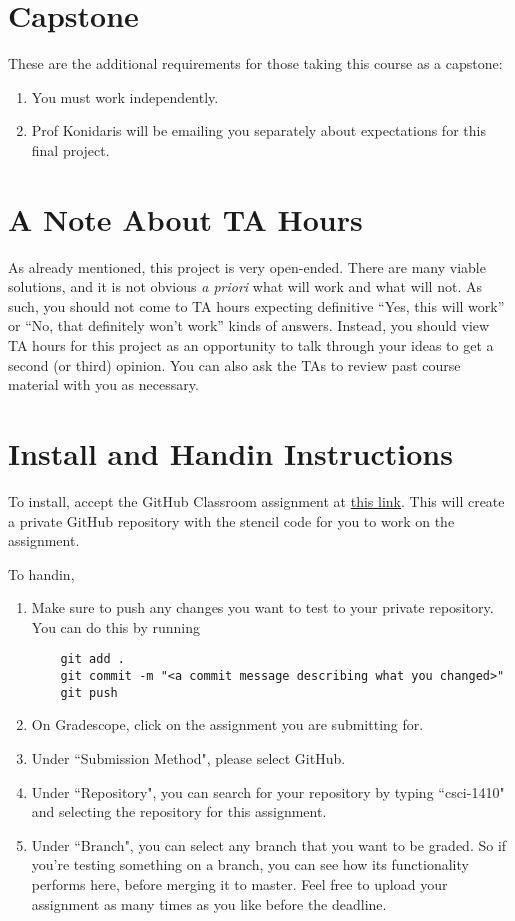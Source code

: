 \documentclass{article}
\begin{document}
\section{Capstone}
These are the additional requirements for those taking this course as a capstone:

\begin{enumerate}
\item You must work independently.

\item Prof Konidaris will be emailing you separately about expectations for this final project. 
\end{enumerate} 


\section{A Note About TA Hours}
As already mentioned, this project is very open-ended.  There are many
viable solutions, and it is not obvious \emph{a priori\/} what will
work and what will not.  As such, you should not come to TA hours
expecting definitive ``Yes, this will work'' or ``No, that definitely
won't work'' kinds of answers.  Instead, you should view TA hours for
this project as an opportunity to talk through your ideas to get a
second (or third) opinion.  You can also ask the TAs to review past
course material with you as necessary.

\section{Install and Handin Instructions}
To install, accept the GitHub Classroom assignment at \href{https://classroom.github.com/a/Mck9HpAD}{this link}. This will
create a private GitHub repository with the stencil code for you to work on the
assignment.

To handin,
\begin{enumerate}
  \item Make sure to push any changes you want to test to your private
    repository. You can do this by running
    \begin{verbatim}
    git add .
    git commit -m "<a commit message describing what you changed>"
    git push
    \end{verbatim}

  \item On Gradescope, click on the assignment you are submitting for.

  \item Under ``Submission Method", please select GitHub.

  \item Under ``Repository", you can search for your repository by typing ``csci-1410"
    and selecting the repository for this assignment.

  \item Under ``Branch", you can select any branch that you want to be graded. So if
    you're testing something on a branch, you can see how its functionality
    performs here, before merging it to master. Feel free to upload your assignment
    as many times as you like before the deadline.
\end{enumerate}
\end{document}
